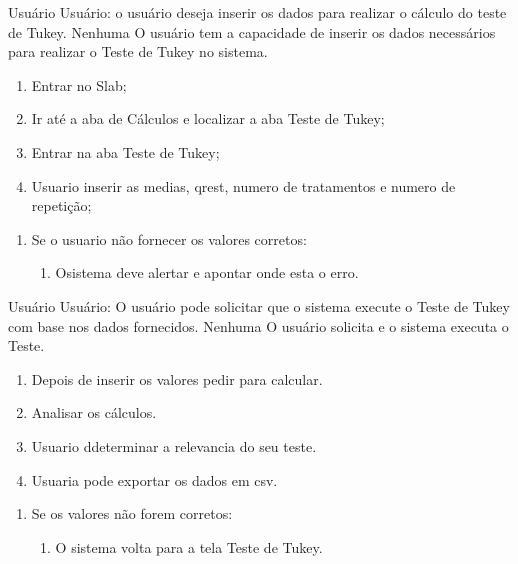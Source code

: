 {Usuário}
{Usuário: o usuário deseja inserir os dados para realizar o cálculo do teste de Tukey.}
{Nenhuma}
{O usuário tem a capacidade de inserir os dados necessários para realizar o Teste de Tukey no sistema.}
{
	\begin{enumerate}[label=FB\arabic*.]
		
		\item Entrar no Slab;
		\item Ir até a aba de Cálculos e localizar a aba Teste de Tukey;
		\item Entrar na aba Teste de Tukey;
		\item Usuario inserir as medias, qrest, numero de tratamentos e numero de repetição;
		
	\end{enumerate}
}{
	\begin{enumerate}[label=FA\arabic*.]
		\item Se o usuario não fornecer os valores corretos:
			\begin{enumerate}
				\item Osistema deve alertar e apontar onde esta o erro.
			\end{enumerate}
	\end{enumerate}
}{}{}

{Usuário}
{Usuário: O usuário pode solicitar que o sistema execute o Teste de Tukey com base nos dados fornecidos.}
{Nenhuma}
{O usuário solicita e o sistema executa o Teste.}
{
	\begin{enumerate}[label=FB\arabic*.]
	
		\item Depois de inserir os valores pedir para calcular.
		\item Analisar os cálculos.
		\item Usuario ddeterminar a relevancia do seu teste.
		\item Usuaria pode exportar os dados em csv.
		
	\end{enumerate}
}{
	\begin{enumerate}[label=FA\arabic*.]
		\item Se os valores não forem corretos:
			\begin{enumerate}
				\item O sistema volta para a tela Teste de Tukey.
			\end{enumerate}
	\end{enumerate}
}{}{}


